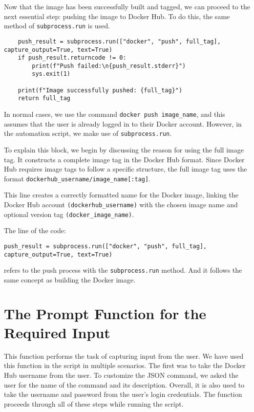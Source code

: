 Now that the image has been successfully built and tagged, we can proceed to the next essential step: pushing the image to Docker Hub. To do this, the same method of \texttt{subprocess.run} is used.


\begin{lstlisting}
    push_result = subprocess.run(["docker", "push", full_tag], capture_output=True, text=True)
    if push_result.returncode != 0:
        print(f"Push failed:\n{push_result.stderr}")
        sys.exit(1)

    print(f"Image successfully pushed: {full_tag}")
    return full_tag
\end{lstlisting}

In normal cases, we use the command \texttt{docker push image\_name}, and this assumes that the user is already logged in to their Docker account. However, in the automation script, we make use of \texttt{subprocess.run}.

To explain this block, we begin by discussing the reason for using the full image tag. It constructs a complete image tag in the Docker Hub format. Since Docker Hub requires image tags to follow a specific structure, the full image tag uses the format \texttt{dockerhub\_username/image\_name[:tag]}.

This line creates a correctly formatted name for the Docker image, linking the Docker Hub account \texttt{(dockerhub\_username)} with the chosen image name and optional version tag \texttt{(docker\_image\_name)}.

The line of the code: 
\begin{lstlisting}
push_result = subprocess.run(["docker", "push", full_tag], capture_output=True, text=True)
\end{lstlisting}
refers to the push process with the \texttt{subprocess.run} method. And it follows the same concept as building the Docker image.

\section{The Prompt Function for the Required Input}

This function performs the task of capturing input from the user.
We have used this function in the script in multiple scenarios. The first was to take the Docker Hub username from the user. To customize the JSON command, we asked the user for the name of the command and its description. Overall, it is also used to take the username and password from the user’s login credentials. The function proceeds through all of these steps while running the script.

